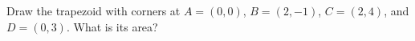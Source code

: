 Draw the trapezoid with corners at $A=(0,0)$, $B=(2,-1)$, $C=(2,4)$, and $D=(0,3)$.  What is its area?

